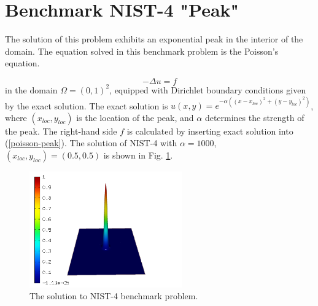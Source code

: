 \section{Benchmark NIST-4 "Peak"}
\label{sec:bench-4}

The solution of this problem exhibits an exponential peak in the interior of the domain.
The equation solved in this benchmark problem is the Poisson's equation.

\begin{equation} \label{poisson-peak}
-\Delta u = f
\end{equation}
in the domain $\Omega = (0, 1)^2$, equipped with Dirichlet
boundary conditions given by the exact solution.
The exact solution is
$u(x,y) = e^{-\alpha ((x - x_{loc})^{2} + (y - y_{loc})^{2})}$,
where $(x_{loc}, y_{loc})$ is the location of the peak,
and $\alpha$ determines the strength of the peak.
The right-hand side $f$ is calculated by inserting exact solution into (\ref{poisson-peak}).
The solution of NIST-4 with $\alpha = 1000$,
$(x_{loc}, y_{loc}) = (0.5, 0.5)$ is shown in Fig. \ref{fig:sln-nist04}.

\begin{figure}[!ht]
\centering
\includegraphics[height=5cm]{nist/nist-4/solution.png}
\caption{The solution to NIST-4 benchmark problem.}
\label{fig:sln-nist04}
\end{figure}

